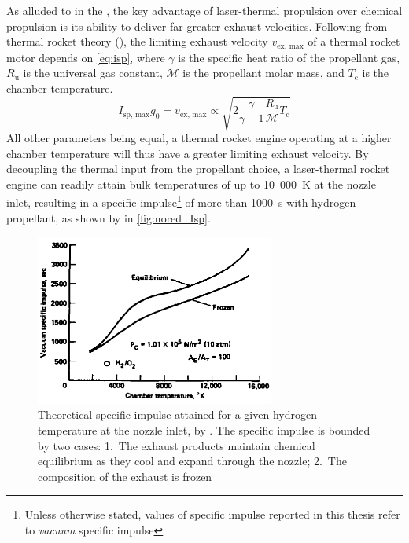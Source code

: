         As alluded to in the , the key advantage of laser-thermal propulsion over chemical propulsion is its ability to deliver far greater exhaust velocities. Following from thermal rocket theory (\textcite{zandbergenAE4S01ThermalRocket2020}), the limiting exhaust velocity $v_\text{ex, max}$ of a thermal rocket motor depends on \autoref{eq:isp}, where $\gamma$ is the specific heat ratio of the propellant gas, $R_\text{u}$ is the universal gas constant, $\mathcal{M}$ is the propellant molar mass, and $T_\text{c}$ is the chamber temperature.
        \begin{equation}
            I_\text{sp, max}g_0 = v_\text{ex, max} \propto \sqrt{2\frac{\gamma}{\gamma-1}\frac{R_\text{u}}{\mathcal{M}}T_\text{c}} \label{eq:isp}
        \end{equation}
        All other parameters being equal, a thermal rocket engine operating at a higher chamber temperature will thus have a greater limiting exhaust velocity. By decoupling the thermal input from the propellant choice, a laser-thermal rocket engine can readily attain bulk temperatures of up to 10~000~K at the nozzle inlet, resulting in a specific impulse\footnote{Unless otherwise stated, values of specific impulse reported in this thesis refer to \emph{vacuum} specific impulse} of more than 1000~s with hydrogen propellant, as shown by \textcite{noredApplicationHighPower1976} in \autoref{fig:nored_Isp}.

        \begin{figure}[h]
            \centering
            \includegraphics[width=0.7\textwidth]{assets/2 background/nored_ltpIsp.png}
            \caption[Theoretical specific impulse attained for a given hydrogen temperature]{Theoretical specific impulse attained for a given hydrogen temperature at the nozzle inlet, by \textcite{noredApplicationHighPower1976}. The specific impulse is bounded by two cases: 1.~The exhaust products maintain chemical equilibrium as they cool and expand through the nozzle; 2.~The composition of the exhaust is frozen}
            \label{fig:nored_Isp}
        \end{figure}

